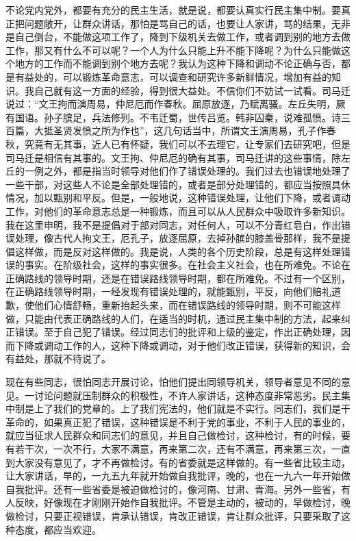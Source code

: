 不论党内党外，都要有充分的民主生活，就是说，都要认真实行民主集中制。要真正把问题敞开，让群众讲话，那怕是骂自己的话，也要让人家讲，骂的结果，无非是自己倒台，不能做这项工作了，降到下级机关去做工作，或者调到别的地方去做工作，那又有什么不可以呢？一个人为什么只能上升不能下降呢？为什么只能做这个地方的工作而不能调到别个地方去呢？我认为这种下降和调动不论正确与否，都是有益处的，可以锻炼革命意志，可以调查和研究许多新鲜情况，增加有益的知识。我自己就有这一方面的经验，得到很大益处。不信你们不妨试一试看。司马迁说过：“文王拘而演周易，仲尼厄而作春秋。屈原放逐，乃赋离骚。左丘失明，厥有国语。孙子膑足，兵法修列。不韦迁蜀，世传吕览。韩非囚秦，说难孤愤。诗三百篇，大抵圣贤发愤之所为作也”，这几句话当中，所谓文王演周易，孔子作春秋，究竟有无其事，近人已有怀疑，我们可以不去理它，让专家们去研究吧，但是司马迁是相信有其事的。文王拘、仲尼厄的确有其事，司马迁讲的这些事情，除左丘的一例之外，都是指当时领导对他们作了错误处理的。我们过去也错误地处理了一些干部，对这些人不论是全部处理错的，或者是部分处理错的，都应当按照具休情况，加以甄别和平反。但是，一般地说，这种错误处理，让他们下降，或者调动工作，对他们的革命意志总是一种锻炼，而且可以从人民群众中吸取许多新知识。我在这里申明，我不是提倡对于部对同志，对任何人，可以不分青红皂白，作出错误处理，像古代人拘文王，厄孔子，放逐屈原，去掉孙膑的膝盖骨那样，我不是提倡这样做，而是反对这样做的。我是说，人类的各个历史阶段，总是有这样处理错误的事实。在阶级社会，这样的事实很多。在社会主义社会，也在所难免。不论在正确路线的领导时期，还是在错误路线领导时期，都在所难免。不过有一个区别，在正确路线领导时期，一经发现有错误处理的，就能甄别，平反，向他们赔礼道歉，使他们心情舒畅，重新抬起头来，而在错误路线的领导时期，则不可能这样做，只能由代表正确路线的人们，在适当的时机，通过民主集中制的方法，起来纠正错误。至于自己犯了错误。经过同志们的批评和上级的鉴定，作出正确处理，因而下降或调动工作的人，这种下降或调动，对于他们改正错误，获得新的知识，会有益处，那就不待说了。

现在有些同志，很怕同志开展讨论，怕他们提出同领导机关，领导者意见不同的意见。一讨论问题就压制群众的积极性，不许人家讲话，这种态度非常恶劣。民主集中制是上了我们的党章的。上了我们宪法的，他们就是不实行。同志们，我们是干革命的，如果真正犯了错误，这种错误是不利于党的事业，不利于人民的事业的，就应当征求人民群众和同志们的意见，并且自己做检讨，这种检讨，有的时候，要有若干次，一次不行，大家不满意，再来第二次，还有不满意，再来第三次，一直到大家没有意见了，才不再做检讨。有的省委就是这样做的。有一些省比较主动，让大家讲话，早的，一九五九年就开始做自我批评，晚的，也在一九六一年开始做自我批评。还有一些省委是被迫做检讨的，像河南、甘肃、青海。另外一些省，有人反映，好像现在才刚刚开始作自我批评。不管是主动的，被动的，早做检讨，晚做检讨，只要正视错误，肯承认错误，肯改正错误，肯让群众批评，只要采取了这种态度，都应当欢迎。

